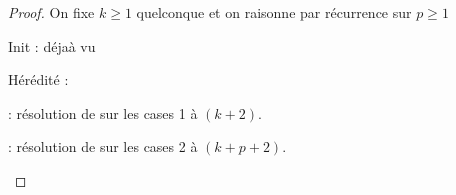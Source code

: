\begin{proof}
    On fixe $k \geq 1$ quelconque et on raisonne par récurrence sur $p \geq 1$

    Init : déjaà vu

    Hérédité :

    \begin{mvts}
        \medskip
        \item  {}

        \medskip
        \item  {} : résolution de  sur les cases 1 à $(k+2)$.

        \medskip
        \item  {} : résolution de  sur les cases 2 à $(k+p+2)$.
    \end{mvts}

\end{proof}
